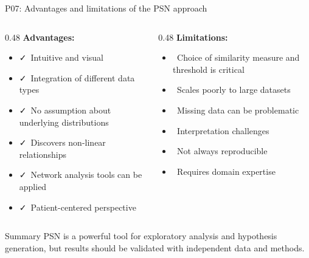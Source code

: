 \documentclass[aspectratio=169, 10pt]{beamer}
\begin{document}
\begin{frame}{P07: Advantages and limitations of the PSN approach}
    \begin{columns}[T]
        \begin{column}{0.48\textwidth}
            \textbf{\textcolor{green!60!black}{Advantages:}}
            \begin{itemize}
                \item \faCheck~Intuitive and visual
                \item \faCheck~Integration of different data types
                \item \faCheck~No assumption about underlying distributions
                \item \faCheck~Discovers non-linear relationships
                \item \faCheck~Network analysis tools can be applied
                \item \faCheck~Patient-centered perspective
            \end{itemize}
        \end{column}
        \begin{column}{0.48\textwidth}
            \textbf{\textcolor{uibred}{Limitations:}}
            \begin{itemize}
                \item \faTimes~Choice of similarity measure and threshold is critical
                \item \faTimes~Scales poorly to large datasets
                \item \faTimes~Missing data can be problematic
                \item \faTimes~Interpretation challenges
                \item \faTimes~Not always reproducible
                \item \faTimes~Requires domain expertise
            \end{itemize}
        \end{column}
    \end{columns}
    
    \vspace{0.5cm}
    \begin{block}{Summary}
        PSN is a powerful tool for exploratory analysis and hypothesis generation, but results should be validated with independent data and methods.
    \end{block}
\end{frame}
\end{document}
